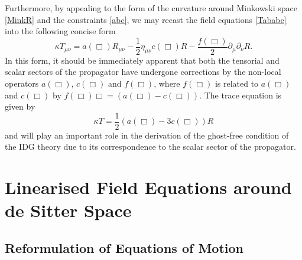 Furthermore, by appealing to the form of the curvature around Minkowski space \eqref{MinkR} and the constraints \eqref{abc}, we may recast the field equations \eqref{Tababc} into the following concise form
\[
\label{eomminkred}
\kappa T_{\mu\nu}	=	a(\Box)R_{\mu\nu}-\frac{1}{2}\eta_{\mu\nu}c(\Box)R-\frac{f(\Box)}{2}\partial_{\mu}\partial_{\nu}R
.\]
In this form, it should be immediately apparent that both the tensorial and scalar sectors of the propagator have undergone corrections by the non-local operators $a(\Box)$, $c(\Box)$ and $f(\Box)$, where $f(\Box)$ is related to $a(\Box)$ and $c(\Box)$ by $f(\Box)\Box=(a(\Box)-c(\Box))$. The trace equation is given by
\[
\label{tracemink}
\kappa T=\frac{1}{2}(a(\Box)-3c(\Box))R
\]
and will play an important role in the derivation of the ghost-free condition of the IDG theory due to its correspondence to the scalar sector of the propagator.
\section{Linearised Field Equations around de Sitter Space}
\subsection*{Reformulation of Equations of Motion}

